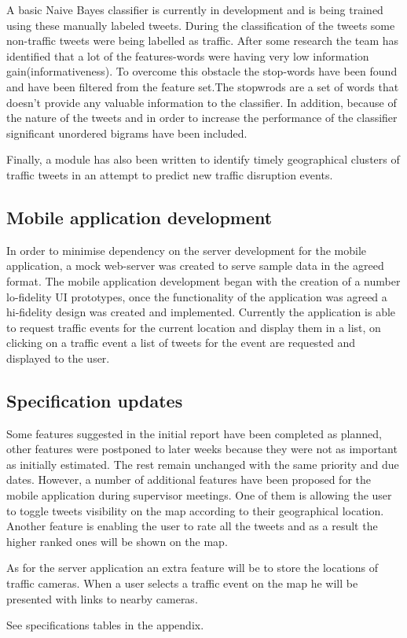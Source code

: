 A basic Naive Bayes classifier is currently in development and is being trained
using these manually labeled tweets. During the classification  of the tweets
some non-traffic tweets were being labelled as traffic. After some 
research the team has identified that a lot of the features-words were having
very low information gain(informativeness). To overcome this obstacle the
stop-words have been found and have been filtered from the feature set.The stopwrods 
are a set of words that doesn't provide any valuable information to the classifier.  In
addition, because of the nature of the tweets and in order to increase the
performance of the classifier significant unordered bigrams have been included. 

Finally, a module has also been written to identify timely geographical
clusters of traffic tweets in an attempt to predict new traffic disruption
events. 


\subsection{Mobile application development}

In order to minimise dependency on the server development for the mobile
application, a  mock web-server was created to serve sample data in the agreed
format. The mobile application development began with the creation of a number
lo-fidelity UI prototypes, once the functionality of the application was agreed
a hi-fidelity design was created and implemented. Currently the application is
able to request traffic events for the current location and display them in a
list, on clicking on a traffic event a list of tweets for the event are
requested and displayed to the user. 

\subsection{Specification updates}

Some features suggested in the initial report have been completed as planned, other features
were postponed to later weeks because they were not as important as initially estimated. 
The rest remain unchanged with the same priority and due dates. However, a number of additional features
have been proposed for the mobile application during supervisor meetings. One
of them is allowing the user to toggle tweets visibility on the map according
to their geographical location. Another feature is enabling the user to rate
all the tweets and as a result the higher ranked ones will be shown on the map.

As for the server application an extra feature will be to store the locations
of traffic cameras. When a user selects a traffic event on the map he will be
presented with links to nearby cameras.

See specifications tables in the appendix.
